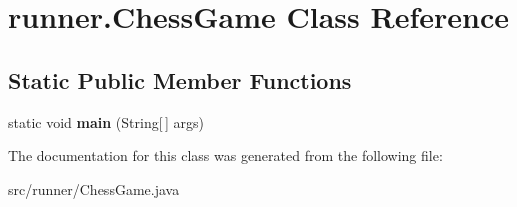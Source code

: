 \hypertarget{classrunner_1_1_chess_game}{\section{runner.\-Chess\-Game Class Reference}
\label{classrunner_1_1_chess_game}
}
\subsection*{Static Public Member Functions}
\begin{DoxyCompactItemize}
\item 
\hypertarget{classrunner_1_1_chess_game_aacd962a1c3446bc4857ab3f32dbafe89}{static void {\bfseries main} (String\mbox{[}$\,$\mbox{]} args)}\label{classrunner_1_1_chess_game_aacd962a1c3446bc4857ab3f32dbafe89}

\end{DoxyCompactItemize}


The documentation for this class was generated from the following file\-:\begin{DoxyCompactItemize}
\item 
src/runner/Chess\-Game.\-java\end{DoxyCompactItemize}

